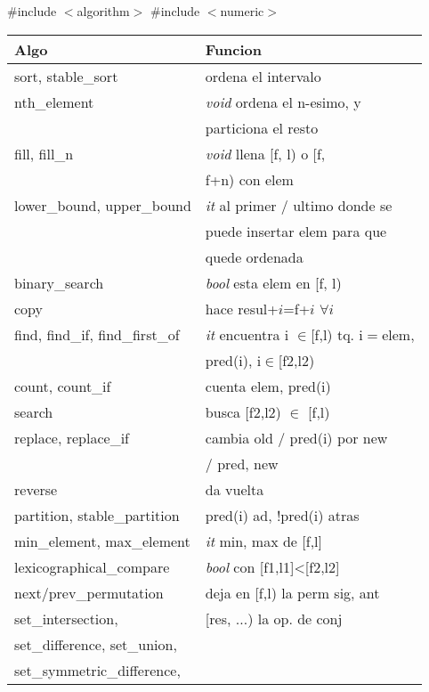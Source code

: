 \#include $<$algorithm$>$ \#include $<$numeric$>$ \\
\begin{tabular}{|l|p{4.7cm}|} \hline
\textbf{Algo} & \textbf{Funcion} \\  \hline
sort, stable\_sort & ordena el intervalo \\  \hline
nth\_element &  \textit{void} ordena el n-esimo, y \\ & particiona el resto \\  \hline
fill, fill\_n & \textit{void} llena [f, l) o [f, \\ & f+n) con elem \\  \hline
lower\_bound, upper\_bound & \textit{it} al primer / ultimo donde se \\ & puede insertar elem para que\\ & quede ordenada \\  \hline
binary\_search & \textit{bool} esta elem en [f, l) \\  \hline
copy & hace resul+$i$=f+$i$ $\forall i$ \\  \hline
find, find\_if, find\_first\_of & \textit{it} encuentra i $\in$[f,l) tq. i$=$elem, \\  & pred(i), i$\in$[f2,l2)\\\hline
count, count\_if & cuenta elem, pred(i)\\\hline
search & busca [f2,l2) $\in$ [f,l)\\\hline
replace, replace\_if & cambia old / pred(i) por new \\ & / pred, new \\\hline
reverse & da vuelta\\\hline
partition, stable\_partition & pred(i) ad, !pred(i) atras\\\hline
min\_element, max\_element & \textit{it} min, max de [f,l]\\\hline
lexicographical\_compare  & \textit{bool} con [f1,l1]<[f2,l2]\\\hline
next/prev\_permutation & deja en [f,l) la perm sig, ant\\\hline
set\_intersection, & [res, $\ldots$) la op. de conj\\
set\_difference, set\_union, &  \\
set\_symmetric\_difference, & \\\hline

\end{tabular}
